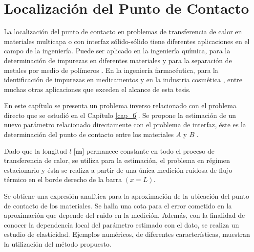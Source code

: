 \chapter{Localizaci\'on del Punto de Contacto} \label{cap_7}

La localizaci\'on del punto de contacto en problemas de transferencia de calor en materiales multicapa
o con interfaz s\'olido-s\'olido tiene diferentes aplicaciones en el campo de la ingenier\'ia. 
Puede ser aplicado en la ingenier\'ia qu\'imica, para la determinaci\'on de impurezas en diferentes materiales \cite{Aziz10,Luke53} y para 
la separaci\'on de metales por medio de pol\'imeros \cite{Rao04,Zhai18}. En 
la ingenier\'ia farmac\'eutica, para la identificaci\'on de impurezas en medicamentos \cite{Gorog00} y en la industria cosm\'etica \cite{Andrisano95}, entre muchas otras aplicaciones que exceden el alcance de esta tesis.

En este cap\'itulo se presenta un problema inverso relacionado con el problema directo que se estudi\'o en el Cap\'itulo \ref{cap_6}. 
Se propone la estimaci\'on de un nuevo par\'ametro 
relacionado directamente con el problema de interfaz, \'este es la determinaci\'on del punto de contacto entre los materiales $A$ y $B$ \cite{Umbricht20b}. 

Dado que la longitud $l$ $\textbf{[m]}$ permanece constante en todo el proceso de transferencia de calor, se utiliza para la estimaci\'on, el problema en r\'egimen estacionario y \'esta se realiza a partir de
una \'unica medici\'on 
ruidosa de flujo t\'ermico en el borde derecho de la barra $(x=L)$. 

Se obtiene una expresi\'on anal\'itica para la aproximaci\'on de la ubicaci\'on del punto de contacto de los materiales. Se halla una cota para el error cometido en la aproximaci\'on que depende del ruido 
en la medici\'on. Adem\'as, con la finalidad de conocer la dependencia local del par\'ametro estimado con el dato, se realiza un estudio de elasticidad. Ejemplos num\'ericos, de diferentes caracter\'isticas, muestran
la utilizaci\'on del m\'etodo propuesto.  


